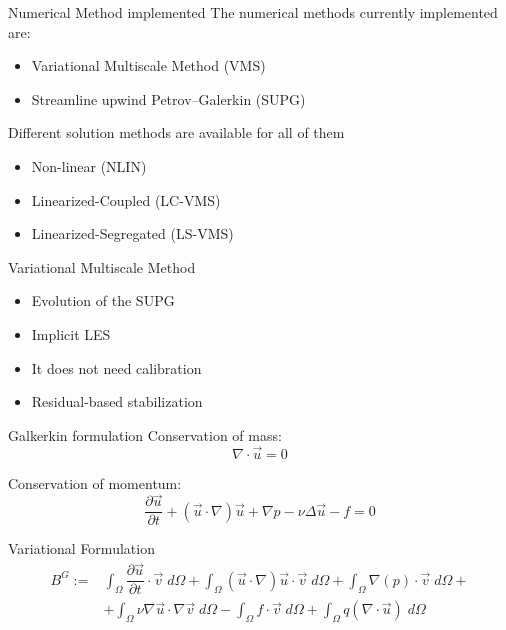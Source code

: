 \begin{frame}{Numerical Method implemented}
The numerical methods currently implemented are:
  \begin{itemize}
    \item Variational Multiscale Method (VMS)
    \item Streamline upwind Petrov–Galerkin (SUPG)
  \end{itemize} 

Different solution methods are available for all of them 
  \begin{itemize}
    \item Non-linear (NLIN)
    \item Linearized-Coupled (LC-VMS)
    \item Linearized-Segregated (LS-VMS)
  \end{itemize} 
\end{frame}


\begin{frame}{Variational Multiscale Method}
  \begin{itemize}
    \item Evolution of the SUPG
    \item Implicit LES
    \item It does not need calibration
    \item Residual-based stabilization
  \end{itemize} 
\end{frame}


\begin{frame}{Galkerkin formulation}
Conservation of mass:
\begin{equation}
    \nabla\cdot \Vec{u} = 0
    \label{equfo:cont}
\end{equation}

Conservation of momentum:
\begin{equation}
    \dfrac{\partial \Vec{u}}{\partial t} + (\Vec{u}\cdot\nabla)\Vec{u} + \nabla p - \nu\Delta\Vec{u} - f = 0
        \label{equfo:mom}
\end{equation}

Variational Formulation
\begin{equation}
\begin{split}
  B^G := &   \int_\Omega \dfrac{\partial \Vec{u}}{\partial t}\cdot \Vec{v}\;d\Omega +
    \int_\Omega(\Vec{u}\cdot\nabla)\Vec{u}\cdot \Vec{v} \;d\Omega+ 
    \int_\Omega \nabla (p)\cdot\Vec{v} \;d\Omega + \\
     & + \int_\Omega\nu\nabla\Vec{u}\cdot\nabla\Vec{v} \;d\Omega  -
        \int_\Omega f\cdot\Vec{v} \;d\Omega + 
    \int_\Omega q(\nabla \cdot \Vec{u})\;d\Omega
    \end{split}
    \label{equ:weak}
\end{equation}

\end{frame}

